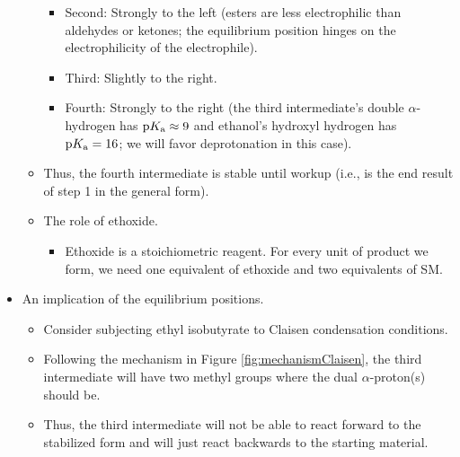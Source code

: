 \documentclass[../notes.tex]{subfiles}
\begin{document}
\begin{itemize}
\begin{itemize}
\begin{itemize}
            \item Second: Strongly to the left (esters are less electrophilic than aldehydes or ketones; the equilibrium position hinges on the electrophilicity of the electrophile).
            \item Third: Slightly to the right.
            \item Fourth: Strongly to the right (the third intermediate's double $\alpha$-hydrogen has $\text{p}K_\text{a}\approx 9$ and ethanol's hydroxyl hydrogen has $\text{p}K_\text{a}=16$; we will favor deprotonation in this case).
        \end{itemize}
        \item Thus, the fourth intermediate is stable until workup (i.e., is the end result of step 1 in the general form).
        \item The role of ethoxide.
        \begin{itemize}
            \item Ethoxide is a stoichiometric reagent. For every unit of product we form, we need one equivalent of ethoxide and two equivalents of SM.
        \end{itemize}
    \end{itemize}
    \item An implication of the equilibrium positions.
    \begin{itemize}
        \item Consider subjecting ethyl isobutyrate to Claisen condensation conditions.
        \item Following the mechanism in Figure \ref{fig:mechanismClaisen}, the third intermediate will have two methyl groups where the dual $\alpha$-proton(s) should be.
        \item Thus, the third intermediate will not be able to react forward to the stabilized form and will just react backwards to the starting material.
    \end{itemize}
\end{itemize}
\end{document}
